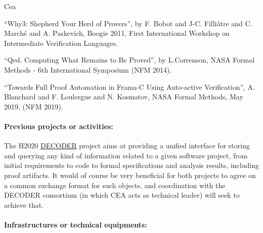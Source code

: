 \begin{sitedescription}{Cea}


\begin{compactitem}
\item ``Why3: Shepherd Your Herd of Provers'', by F. Bobot and J-C. Filli\^atre and
C. March\'e and A. Paskevich, Boogie 2011, First International Workshop on
Intermediate Verification Languages.
\item ``Qed. Computing What Remains to Be Proved'', by L.Correnson, NASA Formal
  Methods - 6th International Symposium (NFM 2014).
\item ``Towards Full Proof Automation in Frama-C Using Auto-active
  Verification'', A. Blanchard and F. Loulergue and N. Kosmatov,
NASA Formal Methods, May 2019, (NFM 2019).
\end{compactitem}

\paragraph*{Previous projects or activities:}


\begin{compactitem}
\item The H2020 \href{https://www.decoder-project.eu}{DECODER} project aims at
providing a unified interface for storing and querying any kind of
information related to a given software project, from initial
requirements to code to formal specifications and analysis results,
including proof artifacts. It would of course be very beneficial for
both projects to agree on a common exchange format for such objects, and
coordination with the DECODER consortium (in which CEA acts as technical
leader) will seek to achieve that.
\end{compactitem}

\paragraph*{Infrastructures or technical equipments:}



\end{sitedescription}

